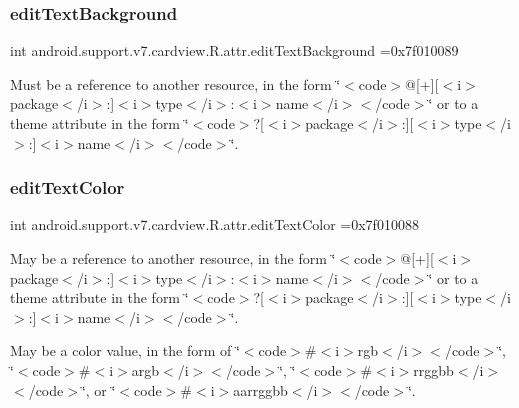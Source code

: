 \subsubsection{\texorpdfstring{edit\+Text\+Background}{editTextBackground}}
{\footnotesize\ttfamily int android.\+support.\+v7.\+cardview.\+R.\+attr.\+edit\+Text\+Background =0x7f010089\hspace{0.3cm}{\ttfamily [static]}}

Must be a reference to another resource, in the form \char`\"{}$<$code$>$@\mbox{[}+\mbox{]}\mbox{[}$<$i$>$package$<$/i$>$\+:\mbox{]}$<$i$>$type$<$/i$>$\+:$<$i$>$name$<$/i$>$$<$/code$>$\char`\"{} or to a theme attribute in the form \char`\"{}$<$code$>$?\mbox{[}$<$i$>$package$<$/i$>$\+:\mbox{]}\mbox{[}$<$i$>$type$<$/i$>$\+:\mbox{]}$<$i$>$name$<$/i$>$$<$/code$>$\char`\"{}. \mbox{\label{classandroid_1_1support_1_1v7_1_1cardview_1_1R_1_1attr_a59b88e30dbbfcf1116c696f3515f01ad}} 
\subsubsection{\texorpdfstring{edit\+Text\+Color}{editTextColor}}
{\footnotesize\ttfamily int android.\+support.\+v7.\+cardview.\+R.\+attr.\+edit\+Text\+Color =0x7f010088\hspace{0.3cm}{\ttfamily [static]}}

May be a reference to another resource, in the form \char`\"{}$<$code$>$@\mbox{[}+\mbox{]}\mbox{[}$<$i$>$package$<$/i$>$\+:\mbox{]}$<$i$>$type$<$/i$>$\+:$<$i$>$name$<$/i$>$$<$/code$>$\char`\"{} or to a theme attribute in the form \char`\"{}$<$code$>$?\mbox{[}$<$i$>$package$<$/i$>$\+:\mbox{]}\mbox{[}$<$i$>$type$<$/i$>$\+:\mbox{]}$<$i$>$name$<$/i$>$$<$/code$>$\char`\"{}. 

May be a color value, in the form of \char`\"{}$<$code$>$\#$<$i$>$rgb$<$/i$>$$<$/code$>$\char`\"{}, \char`\"{}$<$code$>$\#$<$i$>$argb$<$/i$>$$<$/code$>$\char`\"{}, \char`\"{}$<$code$>$\#$<$i$>$rrggbb$<$/i$>$$<$/code$>$\char`\"{}, or \char`\"{}$<$code$>$\#$<$i$>$aarrggbb$<$/i$>$$<$/code$>$\char`\"{}. \mbox{\label{classandroid_1_1support_1_1v7_1_1cardview_1_1R_1_1attr_a00e37547cae9047bd31b90ba0052d707}} 
